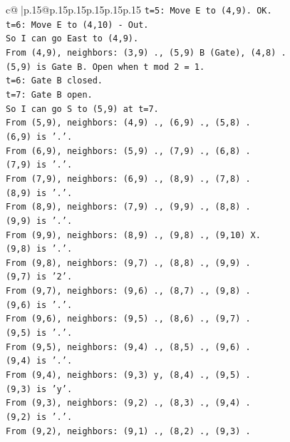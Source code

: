 \documentclass{article}
\begin{document}
{\begin{supertabular}{c@{$\;$}|p{.15\linewidth}@{}p{.15\linewidth}p{.15\linewidth}p{.15\linewidth}p{.15\linewidth}p{.15\linewidth}}
{{{\texttt{t=5: Move E to (4,9). OK.} \\
\texttt{t=6: Move E to (4,10) {-} Out.} \\
\texttt{So I can go East to (4,9).} \\
\texttt{From (4,9), neighbors: (3,9) ., (5,9) B (Gate), (4,8) .} \\
\texttt{(5,9) is Gate B. Open when t mod 2 = 1.} \\
\texttt{t=6: Gate B closed.} \\
\texttt{t=7: Gate B open.} \\
\texttt{So I can go S to (5,9) at t=7.} \\
\texttt{From (5,9), neighbors: (4,9) ., (6,9) ., (5,8) .} \\
\texttt{(6,9) is '.'.} \\
\texttt{From (6,9), neighbors: (5,9) ., (7,9) ., (6,8) .} \\
\texttt{(7,9) is '.'.} \\
\texttt{From (7,9), neighbors: (6,9) ., (8,9) ., (7,8) .} \\
\texttt{(8,9) is '.'.} \\
\texttt{From (8,9), neighbors: (7,9) ., (9,9) ., (8,8) .} \\
\texttt{(9,9) is '.'.} \\
\texttt{From (9,9), neighbors: (8,9) ., (9,8) ., (9,10) X.} \\
\texttt{(9,8) is '.'.} \\
\texttt{From (9,8), neighbors: (9,7) ., (8,8) ., (9,9) .} \\
\texttt{(9,7) is '2'.} \\
\texttt{From (9,7), neighbors: (9,6) ., (8,7) ., (9,8) .} \\
\texttt{(9,6) is '.'.} \\
\texttt{From (9,6), neighbors: (9,5) ., (8,6) ., (9,7) .} \\
\texttt{(9,5) is '.'.} \\
\texttt{From (9,5), neighbors: (9,4) ., (8,5) ., (9,6) .} \\
\texttt{(9,4) is '.'.} \\
\texttt{From (9,4), neighbors: (9,3) y, (8,4) ., (9,5) .} \\
\texttt{(9,3) is 'y'.} \\
\texttt{From (9,3), neighbors: (9,2) ., (8,3) ., (9,4) .} \\
\texttt{(9,2) is '.'.} \\
\texttt{From (9,2), neighbors: (9,1) ., (8,2) ., (9,3) .} \\
}}}
\end{supertabular}}
\end{document}
